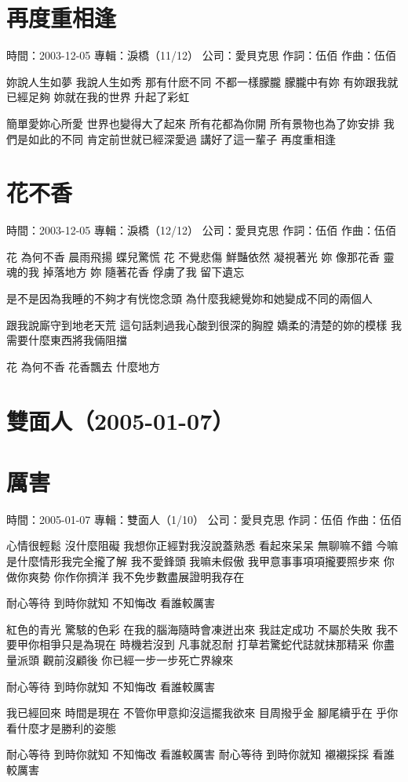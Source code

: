 \documentclass[UTF8,a4paper,oneside,twocolumn,12pt]{ctexbook}
\newcommand{\infopair}[2]{\textbullet #1：#2}
\newcommand{\zc}[1][伍佰]{\infopair{作詞}{#1}}
\newcommand{\zq}[1][伍佰]{\infopair{作曲}{#1}}
\newcommand{\zj}[1]{\infopair{專輯}{#1}}
\newcommand{\sj}[1]{\infopair{時間}{#1}}
\newcommand{\gs}[1]{\infopair{公司}{#1}}
\newenvironment{info}{\begin{flushleft}\kaishu
	}
	{\end{flushleft}\normalsize\yahei\par}
\newenvironment{lyric}{
	}
{}
\begin{document}
\section{再度重相逢}
\begin{info}
	\sj{2003-12-05}
	\zj{淚橋（11/12）}
	\gs{愛貝克思}
	\zc
	\zq
\end{info}
\begin{lyric}
	妳說人生如夢 我說人生如秀
	那有什麽不同 不都一樣朦朧
	朦朧中有妳 有妳跟我就已經足夠
	妳就在我的世界 升起了彩虹

	簡單愛妳心所愛 世界也變得大了起來
	所有花都為你開 所有景物也為了妳安排
	我們是如此的不同 肯定前世就已經深愛過
	講好了這一輩子 再度重相逢
\end{lyric}

\section{花不香}
\begin{info}
	\sj{2003-12-05}
	\zj{淚橋（12/12）}
	\gs{愛貝克思}
	\zc
	\zq
\end{info}
\begin{lyric}
	花 為何不香 晨雨飛揚 蝶兒驚慌
	花 不覺悲傷 鮮豔依然 凝視著光
	妳 像那花香 靈魂的我 掉落地方
	妳 隨著花香 俘虜了我 留下遺忘

	是不是因為我睡的不夠才有恍惚念頭
	為什麼我總覺妳和她變成不同的兩個人

	跟我說廝守到地老天荒
	這句話刺過我心酸到很深的胸膛
	嬌柔的清楚的妳的模樣
	我需要什麼東西將我倆阻擋

	花 為何不香 花香飄去 什麼地方
\end{lyric}

\section*{雙面人（2005-01-07）}
\section{厲害}
\begin{info}
	\sj{2005-01-07}
	\zj{雙面人（1/10）}
	\gs{愛貝克思}
	\zc
	\zq
\end{info}
\begin{lyric}
	心情很輕鬆 沒什麼阻礙 我想你正經對我沒說蓋熟悉
	看起來呆呆 無聊嘛不錯 今嘛是什麼情形我完全攏了解
	我不愛鋒頭 我嘛未假傲 我甲意事事項項攏要照步來
	你做你爽勢 你作你擠洋 我不免步數盡展證明我存在

	耐心等待 到時你就知
	不知悔改 看誰較厲害

	紅色的青光 驚駭的色彩 在我的腦海隨時會凍迸出來
	我註定成功 不屬於失敗 我不要甲你相爭只是為現在
	時機若沒到 凡事就忍耐 打草若驚蛇代誌就抹那精采
	你盡量派頭 觀前沒顧後 你已經一步一步死亡界線來

	耐心等待 到時你就知
	不知悔改 看誰較厲害

	我已經回來 時間是現在 不管你甲意抑沒這擺我欲來
	目周撥乎金 腳尾續乎在 乎你看什麼才是勝利的姿態

	耐心等待 到時你就知
	不知悔改 看誰較厲害
	耐心等待 到時你就知
	襯襯採採 看誰較厲害
\end{lyric}
\end{document}
